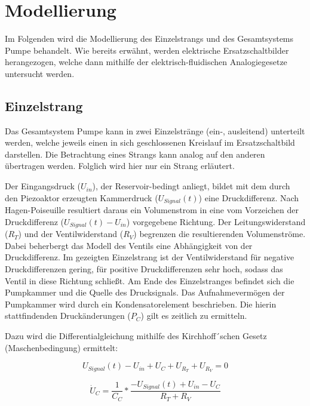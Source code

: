 \documentclass[fontsize=12pt, a4paper]{scrartcl}
\let\stdsection\section 	%
\renewcommand\section{\newpage\stdsection}
\begin{document}
\section{Modellierung}

Im Folgenden wird die Modellierung des Einzelstrangs und des Gesamtsystems Pumpe behandelt.
Wie bereits erwähnt, werden elektrische Ersatzschaltbilder herangezogen, welche dann mithilfe der elektrisch-fluidischen Analogiegesetze untersucht werden.

\subsection{Einzelstrang}

Das Gesamtsystem Pumpe kann in zwei Einzelstränge (ein-, ausleitend) unterteilt werden, welche jeweils einen in sich geschlossenen Kreislauf im Ersatzschaltbild darstellen.
Die Betrachtung eines Strangs kann analog auf den anderen übertragen werden. Folglich wird hier nur ein Strang erläutert.

\begin{center}
	
\end{center}

Der Eingangsdruck ($U_{in}$), der Reservoir-bedingt anliegt, bildet mit dem durch den Piezoaktor erzeugten Kammerdruck ($U_{Signal}(t)$) eine Druckdifferenz. Nach Hagen-Poiseuille resultiert daraus ein Volumenstrom in eine vom Vorzeichen der Druckdifferenz ($U_{Signal}(t)-U_{in}$) vorgegebene Richtung. Der Leitungswiderstand ($R_{T}$) und der Ventilwiderstand ($R_{V}$) begrenzen die resultierenden Volumenströme. Dabei beherbergt das Modell des Ventils eine Abhängigkeit von der Druckdifferenz. Im gezeigten Einzelstrang ist der Ventilwiderstand für negative Druckdifferenzen gering, für positive Druckdifferenzen sehr hoch, sodass das Ventil in diese Richtung schließt. Am Ende des Einzelstranges befindet sich die Pumpkammer und die Quelle des Drucksignals. Das Aufnahmevermögen der Pumpkammer wird durch ein Kondensatorelement beschrieben. Die hierin stattfindenden Druckänderungen ($P_{C}$) gilt es zeitlich zu ermitteln.

Dazu wird die Differentialgleichung mithilfe des Kirchhoff´schen Gesetz (Maschenbedingung) ermittelt:

\[ U_{Signal}(t) - U_{in} + U_{C} + U_{R_{T}} + U_{R_{V}} = 0 \]

\[ \dot{U}_{C} = \frac{1}{C_{C}} * \frac{-U_{Signal}(t)+U_{in}-U_{C}}{R_{T}+R_{V}} \]
\end{document}
